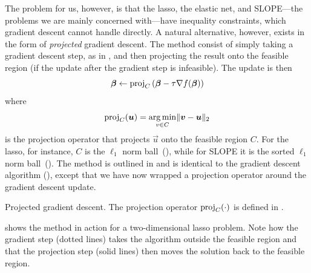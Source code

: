 The problem for us, however, is that the lasso, the elastic net, and SLOPE---the problems we are mainly concerned with---have inequality constraints, which gradient descent cannot handle directly.
A natural alternative, however, exists in the form of \emph{projected} gradient descent. The method consist of simply taking a gradient descent step, as in , and then projecting the result onto the feasible region (if the update after the gradient step is infeasible). The update is then
\[
  \boldsymbol{\beta} \gets \operatorname{proj}_{C}\left(\boldsymbol{\beta} - \tau \nabla f(\boldsymbol{\beta})\right)
\]
where
\begin{equation}
  \label{eq:projection}
  \operatorname{proj}_{C}(\boldsymbol{u}) = \operatorname*{arg\,min}_{v \in C} \lVert \boldsymbol{v} - \boldsymbol{u}\rVert_2
\end{equation}
is the projection operator that projects \(\vec{u}\) onto the feasible region \(C\). For the lasso, for instance, \(C\) is the \(\ell_1\) norm ball~(), while for SLOPE it is the sorted \(\ell_1\) norm ball~(). The method is outlined in  and is identical to the gradient descent algorithm (), except that we have now wrapped a projection operator around the gradient descent update.

\begin{algorithm}
  \caption{Projected gradient descent. The projection operator \(\operatorname{proj}_C(\cdot)\) is defined in .}
  \label{alg:projected-gradient-descent}
\end{algorithm}

 shows the method in action for a two-dimensional lasso problem. Note how the gradient step (dotted lines) takes the algorithm outside the feasible region and that the projection step (solid lines) then moves the solution back to the feasible region.

